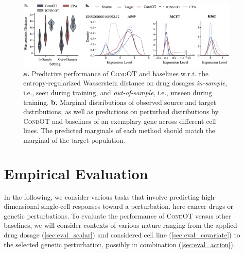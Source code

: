 \begin{figure}
    \centering
    \includegraphics[width=\textwidth]{figures/fig_sciplex_main_results.png}
    \caption{\textbf{a.}  Predictive performance of \textsc{CondOT} and baselines w.r.t. the entropy-regularized Wasserstein distance on drug dosages \emph{in-sample}, i.e., seen during training, and \emph{out-of-sample}, i.e., unseen during training. \textbf{b.} Marginal distributions of observed source and target distributions, as well as predictions on perturbed distributions by \textsc{CondOT} and baselines of an exemplary gene across different cell lines. The predicted marginals of each method should match the marginal of the target population.}
    \label{fig:exp_scalar_sciplex}
\end{figure}

\section{Empirical Evaluation} \label{sec:evaluation_condot}

In the following, we consider various tasks that involve predicting high-dimensional single-cell responses toward a perturbation, here cancer drugs or genetic perturbations. 
To evaluate the performance of \textsc{CondOT} versus other baselines, we will consider contexts of various nature ranging from the applied drug dosage (\cref{sec:eval_scalar}) and considered cell line (\cref{sec:eval_covariate}) to the selected genetic perturbation, possibly in combination (\cref{sec:eval_action}).

